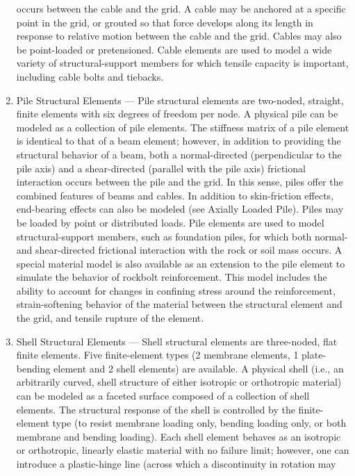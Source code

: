\documentclass[a4paper, nobind]{templates/ociamthesis}
\begin{document}
\begin{enumerate}
  occurs between the cable and the grid. A cable may be anchored at a
  specific point in the grid, or grouted so that force develops along
  its length in response to relative motion between the cable and the
  grid. Cables may also be point-loaded or pretensioned. Cable
  elements are used to model a wide variety of structural-support
  members for which tensile capacity is important, including cable
  bolts and tiebacks.
\item
  Pile Structural Elements --- Pile structural elements are two-noded,
  straight, finite elements with six degrees of freedom per node. A
  physical pile can be modeled as a collection of pile elements. The
  stiffness matrix of a pile element is identical to that of a beam
  element; however, in addition to providing the structural behavior
  of a beam, both a normal-directed (perpendicular to the pile axis)
  and a shear-directed (parallel with the pile axis) frictional
  interaction occurs between the pile and the grid. In this sense,
  piles offer the combined features of beams and cables. In addition
  to skin-friction effects, end-bearing effects can also be modeled
  (see Axially Loaded Pile). Piles may be loaded by point or
  distributed loads. Pile elements are used to model
  structural-support members, such as foundation piles, for which both
  normal- and shear-directed frictional interaction with the rock or
  soil mass occurs. A special material model is also available as an
  extension to the pile element to simulate the behavior of rockbolt
  reinforcement. This model includes the ability to account for
  changes in confining stress around the reinforcement,
  strain-softening behavior of the material between the structural
  element and the grid, and tensile rupture of the element.
\item
  Shell Structural Elements --- Shell structural elements are
  three-noded, flat finite elements. Five finite-element types (2
  membrane elements, 1 plate-bending element and 2 shell elements) are
  available. A physical shell (i.e., an arbitrarily curved, shell
  structure of either isotropic or orthotropic material) can be
  modeled as a faceted surface composed of a collection of shell
  elements. The structural response of the shell is controlled by the
  finite-element type (to resist membrane loading only, bending
  loading only, or both membrane and bending loading). Each shell
  element behaves as an isotropic or orthotropic, linearly elastic
  material with no failure limit; however, one can introduce a
  plastic-hinge line (across which a discontinuity in rotation may

\end{enumerate}
\end{document}
